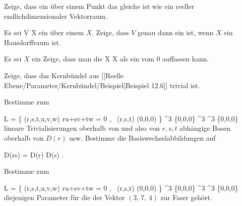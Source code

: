 \setcounter{section}{12}

{}
{

Zeige, dass ein
über einem Punkt
 {} {}
das gleiche ist wie ein reeller endlichdimensionaler Vektorraum.

}
{} {}

{}
{

Es sei
 { V } { X
} {}
ein
über einem
$X$. Zeige, dass $V$ genau dann ein
ist, wenn $X$ ein Hausdorffraum ist.

}
{} {}

{}
{

Es sei $X$ ein
Zeige, dass man die
 { X } { X
} {}
als ein
vom
$0$ auffassen kann.

}
{} {}

{}
{

Zeige, dass das Kernbündel aus
[[Reelle Ebene/Parameter/Kernbündel/Beispiel|Beispiel 12.6]]
trivial ist.

}
{} {}

{}
{

Bestimme zum

\mavergleichskettedisp
{\vergleichskette
{L
}
{ =} { \left\{ (r,s,t,u,v,w)  \mid  ru+sv+tw = 0 , \, (r,s,t) \neq (0,0,0)       \right\}
}
{ \subseteq} { \R^3 \setminus \{0,0,0\} \times \R^3
}
{ \longrightarrow} { \R^3 \setminus \{0,0,0\}
}
{ } {
}
}
{}{}{}
lineare Trivialisierungen oberhalb von
 und
 also von $r,s,t$ abhängige Basen oberhalb von $D(r)$ usw. Bestimme die Basiswechselabbildungen auf

\mavergleichskette
{\vergleichskette
{D(rs)
}
{ = }{ D(r) \cap D(s)
}
{  }{
}
{    }{
}
{   }{
}
}
{}{}{.}

}
{} {}

{}
{

Bestimme zum

\mavergleichskettedisp
{\vergleichskette
{L
}
{ =} { \left\{ (r,s,t,u,v,w)  \mid  ru+sv+tw = 0 , \, (r,s,t) \neq (0,0,0)       \right\}
}
{ \subseteq} { \R^3 \setminus \{0,0,0\} \times \R^3
}
{ \longrightarrow} { \R^3 \setminus \{0,0,0\}
}
{ } {
}
}
{}{}{}
diejenigen Parameter
 für die der Vektor $\left(  3   , \,   7  , \,   4                 \right)$ zur Faser
 gehört.

}
{} {}

